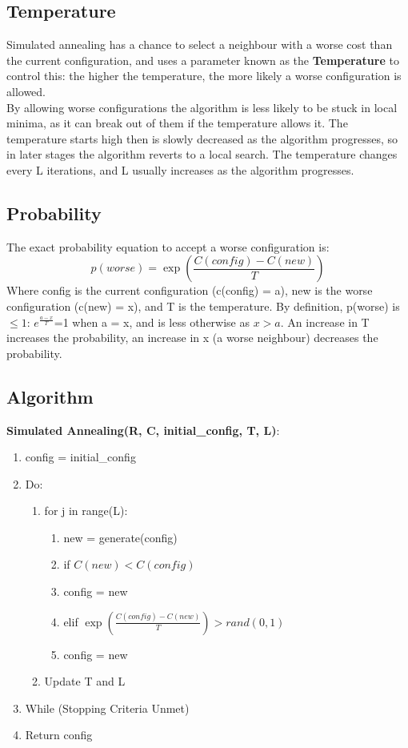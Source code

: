 \subsection{Temperature}
Simulated annealing has a chance to select a neighbour with a worse cost than the current configuration, and uses a parameter known as the \textbf{Temperature} to control this: the higher the temperature, the more likely a worse configuration is allowed. \\
By allowing worse configurations the algorithm is less likely to be stuck in local minima, as it can break out of them if the temperature allows it. The temperature starts high then is slowly decreased as the algorithm progresses, so in later stages the algorithm reverts to a local search. The temperature changes every L iterations, and L usually increases as the algorithm progresses.

\subsection{Probability}
The exact probability equation to accept a worse configuration is:
\begin{equation}
    p(worse) = \exp{\left(\frac{C(config)-C(new)}{T}\right)}
\end{equation}
Where config is the current configuration (c(config) = a), new is the worse configuration (c(new) = x), and T is the temperature. By definition, p(worse) is $\leq 1$: $e^{\frac{a-x}{T}}$=1 when a = x, and is less otherwise as $x>a$. An increase in T increases the probability, an increase in x (a worse neighbour) decreases the probability.

\subsection{Algorithm}
\textbf{Simulated Annealing(R, C, initial\_config, T, L)}:
\begin{enumerate}[label=\Alph*]
    \item config = initial\_config
    \item Do: 
\begin{enumerate}[label=\arabic*]
    \item [] for j in range(L):
    \begin{enumerate}
        \item new = generate(config)
        \item if $C(new) < C(config)$
        \item [] \quad config = new
        \item elif $\exp{\left(\frac{C(config)-C(new)}{T}\right)} > rand(0,1)$
        \item [] \quad config = new
    \end{enumerate}
    \item Update T and L
\end{enumerate}  
\item [] While (Stopping Criteria Unmet)
\item Return config
\end{enumerate}

